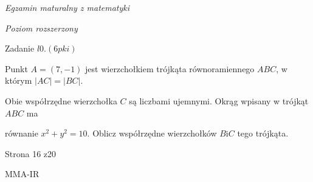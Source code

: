 \documentclass[a4paper,12pt]{article}
\begin{document}
{\it Egzamin maturalny z matematyki}

{\it Poziom rozszerzony}

Zadanie $l0. (6pki)$

Punkt $A=(7,-1)$ jest wierzchołkiem trójkąta równoramiennego $ABC$, w którym $|AC|=|BC|.$

Obie współrzędne wierzchołka $C$ są liczbami ujemnymi. Okrąg wpisany w trójkąt $ABC$ ma

równanie $x^{2}+y^{2}=10$. Oblicz współrzędne wierzchołków $B\mathrm{i}C$ tego trójkąta.

Strona 16 z20

MMA-IR
\end{document}
